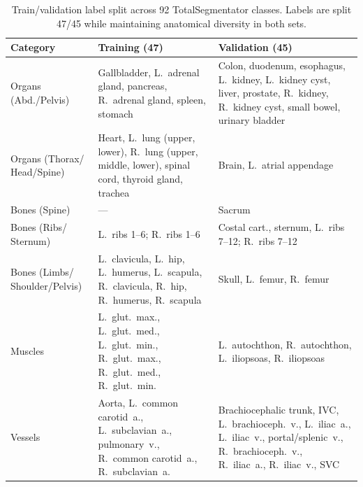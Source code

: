 \documentclass[runningheads]{llncs}
\begin{document}
\newpage
\begin{table}[t]
\centering
\caption{Train/validation label split across 92 TotalSegmentator classes. Labels are split 47/45 while maintaining anatomical diversity in both sets.}\label{tab:label_splits}
\small
\begin{tabular}{|p{3.2cm}|p{5.5cm}|p{5.5cm}|}
\toprule
\textbf{Category} & \textbf{Training (47)} & \textbf{Validation (45)} \\
\midrule
Organs (Abd./Pelvis) & Gallbladder, L.~adrenal gland, pancreas, R.~adrenal gland, spleen, stomach & Colon, duodenum, esophagus, L.~kidney, L.~kidney cyst, liver, prostate, R.~kidney, R.~kidney cyst, small bowel, urinary bladder \\
\midrule
Organs (Thorax/ Head/Spine) & Heart, L.~lung (upper, lower), R.~lung (upper, middle, lower), spinal cord, thyroid gland, trachea & Brain, L.~atrial appendage \\
\midrule
Bones (Spine) & --- & Sacrum \\
\midrule
Bones (Ribs/ Sternum) & L.~ribs 1--6; R.~ribs 1--6 & Costal cart., sternum, L.~ribs 7--12; R.~ribs 7--12 \\
\midrule
Bones (Limbs/ Shoulder/Pelvis) & L.~clavicula, L.~hip, L.~humerus, L.~scapula, R.~clavicula, R.~hip, R.~humerus, R.~scapula & Skull, L.~femur, R.~femur \\
\midrule
Muscles & L.~glut.~max., L.~glut.~med., L.~glut.~min., R.~glut.~max., R.~glut.~med., R.~glut.~min. & L.~autochthon, R.~autochthon, L.~iliopsoas, R.~iliopsoas \\
\midrule
Vessels & Aorta, L.~common carotid~a., L.~subclavian~a., pulmonary~v., R.~common carotid~a., R.~subclavian~a. & Brachiocephalic trunk, IVC, L.~brachioceph.~v., L.~iliac~a., L.~iliac~v., portal/splenic~v., R.~brachioceph.~v., R.~iliac~a., R.~iliac~v., SVC \\
\bottomrule
\end{tabular}
\end{table}
\end{document}
